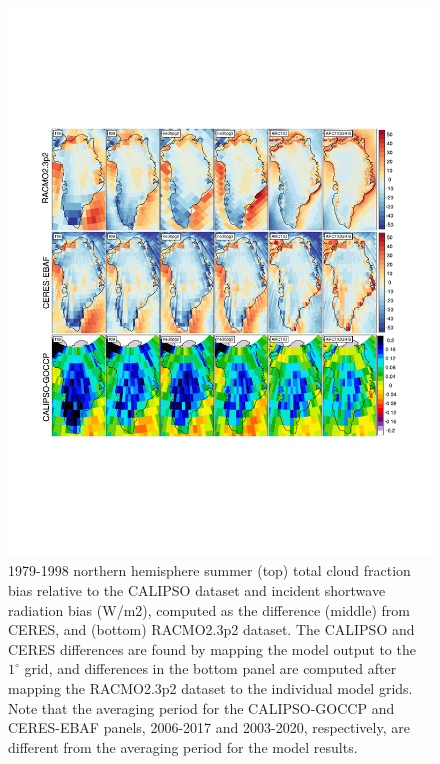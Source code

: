 \documentclass[draft]{agujournal2019}
\begin{document}
\begin{figure}[t]
\begin{center}
         \includegraphics[width=130mm]{figs/temp_contours_diffCALIPSOdiffCERESdiffRACMO.pdf}
\end{center}
\caption{1979-1998 northern hemisphere summer (top) total cloud fraction bias relative to the CALIPSO dataset and incident shortwave radiation bias (W/m2), computed as the difference (middle) from CERES, and (bottom) RACMO2.3p2 dataset. The CALIPSO and CERES differences are found by mapping the model output to the $1^{\circ}$ grid, and differences in the bottom panel are computed after mapping the RACMO2.3p2 dataset to the individual model grids. Note that the averaging period for the CALIPSO-GOCCP and CERES-EBAF panels, 2006-2017 and 2003-2020, respectively, are different from the averaging period for the model results.}
\label{fig:FSDS}
\end{figure}
\end{document}
